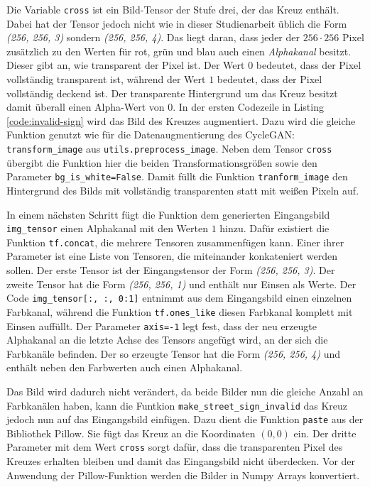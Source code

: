 Die Variable \texttt{cross} ist ein Bild-Tensor der Stufe drei, der das Kreuz enthält. Dabei hat der Tensor jedoch nicht wie in dieser Studienarbeit üblich die Form \emph{(256, 256, 3)} sondern \emph{(256, 256, 4)}. Das liegt daran, dass jeder der $256\cdot 256$ Pixel zusätzlich zu den Werten für rot, grün und blau auch einen \emph{Alphakanal} besitzt. Dieser gibt an, wie transparent der Pixel ist. Der Wert $0$ bedeutet, dass der Pixel vollständig transparent ist, während der Wert $1$ bedeutet, dass der Pixel vollständig deckend ist. Der transparente Hintergrund um das Kreuz besitzt damit überall einen Alpha-Wert von $0$. In der ersten Codezeile in Listing \ref{code:invalid-sign} wird das Bild des Kreuzes augmentiert. Dazu wird die gleiche Funktion genutzt wie für die Datenaugmentierung des \ac{CycleGAN}: \texttt{transform_image} aus \texttt{utils.preprocess_image}. Neben dem Tensor \texttt{cross} übergibt die Funktion hier die beiden Transformationsgrößen sowie den Parameter \texttt{bg_is_white=False}. Damit füllt die Funktion \texttt{tranform_image} den Hintergrund des Bilds mit vollständig transparenten statt mit weißen Pixeln auf.

In einem nächsten Schritt fügt die Funktion dem generierten Eingangsbild \texttt{img_tensor} einen Alphakanal mit den Werten $1$ hinzu. Dafür existiert die Funktion \texttt{tf.concat}, die mehrere Tensoren zusammenfügen kann. Einer ihrer Parameter ist eine Liste von Tensoren, die miteinander konkateniert werden sollen. Der erste Tensor ist der Eingangstensor der Form \emph{(256, 256, 3)}. Der zweite Tensor hat die Form \emph{(256, 256, 1)} und enthält nur Einsen als Werte. Der Code \texttt{img_tensor[:, :, 0:1]} entnimmt aus dem Eingangsbild einen einzelnen Farbkanal, während die Funktion \texttt{tf.ones_like} diesen Farbkanal komplett mit Einsen auffüllt. Der Parameter \texttt{axis=-1} legt fest, dass der neu erzeugte Alphakanal an die letzte Achse des Tensors angefügt wird, an der sich die Farbkanäle befinden. Der so erzeugte Tensor hat die Form \emph{(256, 256, 4)} und enthält neben den Farbwerten auch einen Alphakanal.

Das Bild wird dadurch nicht verändert, da beide Bilder nun die gleiche Anzahl an Farbkanälen haben, kann die Funtkion \texttt{make_street_sign_invalid} das Kreuz jedoch nun auf das Eingangsbild einfügen. Dazu dient die Funktion \texttt{paste} aus der Bibliothek Pillow. Sie fügt das Kreuz an die Koordinaten $(0,0)$ ein. Der dritte Parameter mit dem Wert \texttt{cross} sorgt dafür, dass die transparenten Pixel des Kreuzes erhalten bleiben und damit das Eingangsbild nicht überdecken. Vor der Anwendung der Pillow-Funktion werden die Bilder in Numpy Arrays konvertiert. \cite{pillow}

